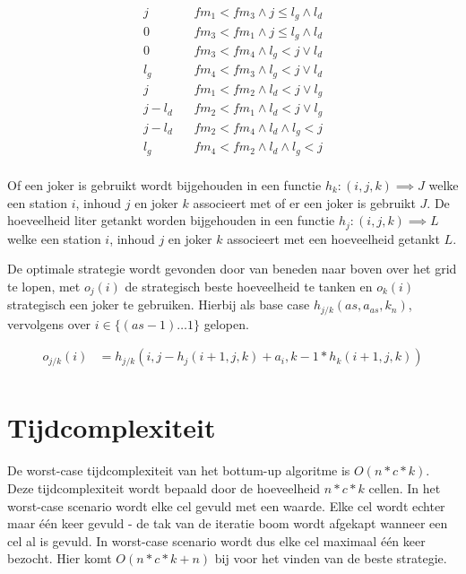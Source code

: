 \documentclass[10pt,tikz]{article}
\begin{document}
\begin{equation}
	\begin{aligned}
		j   \ \ \ \         & fm_{1} < fm_{3} \land j \leq l_g \land l_d \\
		0   \ \ \ \         & fm_{3} < fm_{1} \land j \leq l_g \land l_d \\
		0    \ \ \ \        & fm_{3} < fm_4 \land l_g < j \lor l_d       \\
		l_g    \ \ \ \      & fm_{4} < fm_3 \land l_g < j \lor l_d       \\
		j    \ \ \ \        & fm_1 < fm_2 \land l_d < j \lor l_g         \\
		j - l_d    \ \ \ \  & fm_2 < fm_1 \land l_d < j \lor l_g         \\
		j - l_d    \ \ \ \  & fm_2 < fm_4 \land l_d \land l_g < j        \\
		l_g    \ \ \ \      & fm_4 < fm_2 \land l_d \land l_g < j        \\
	\end{aligned}
	\label{eq:getankt}
\end{equation}

Of een joker is gebruikt wordt bijgehouden in een functie $h_k: (i,j,k) \implies J$ welke een station $i$, inhoud $j$ en joker $k$  associeert met of er een joker is gebruikt $J$.
De hoeveelheid liter getankt worden bijgehouden in een functie $h_j: (i,j,k) \implies L$ welke een station $i$, inhoud $j$ en joker $k$ associeert met een hoeveelheid getankt $L$.

De optimale strategie wordt gevonden door van beneden naar boven over het grid te lopen, met $o_j(i)$ de strategisch beste hoeveelheid te tanken en $o_k(i)$ strategisch een joker te gebruiken.
Hierbij als base case $h_{j/k}(as, a_{as}, k_n)$, vervolgens over $i \in \{(as - 1) \dots 1\}$ gelopen.

\begin{equation}
	\begin{aligned}
		o_{j/k}(i) & = h_{j/k}(i, j - h_j(i + 1, j, k) + a_i, k - 1 * h_k(i + 1, j, k)) \\
	\end{aligned}
	\label{eq:strategie}
\end{equation}

\section*{Tijdcomplexiteit}
De worst-case tijdcomplexiteit van het bottum-up algoritme is $O(n*c*k)$. 
Deze tijdcomplexiteit wordt bepaald door de hoeveelheid $n*c*k$ cellen.
In het worst-case scenario wordt elke cel gevuld met een waarde.
Elke cel wordt echter maar \'e\'en keer gevuld - de tak van de iteratie boom wordt afgekapt wanneer een cel al is gevuld.
In worst-case scenario wordt dus elke cel maximaal \'e\'en keer bezocht. Hier komt $O(n*c*k+n)$ bij voor het vinden van de beste strategie.
\end{document}
